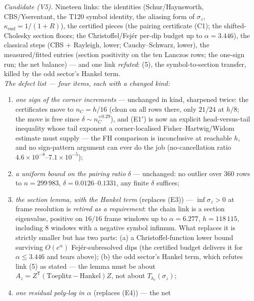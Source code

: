 \documentclass[11pt,a4paper]{article}
\begin{document}
\begin{keybox}
\emph{Candidate (V5).} Nineteen links: the identities (Schur/Haynsworth, CBS/Yserentant, the
T120 symbol identity, the aliasing form of $\sigma_z$, $\kappa_{\mathrm{end}}=1/(1+R)$), the
certified pieces (the pairing certificate (C1); the shifted-Cholesky section floors; the
Christoffel/Fej\'er per-dip budget up to $\alpha=3.446$), the classical steps (CBS + Rayleigh,
lower; Cauchy--Schwarz, lower), the measured/fitted entries (section positivity on the ten
Lanczos rows; the one-sign run; the net balance) --- and one link \emph{refuted}: (5), the
symbol-to-section transfer, killed by the odd sector's Hankel term.\\[3pt]
\emph{The defect list --- four items, each with a changed kind:}
\begin{enumerate}[leftmargin=1.6em]
\item[\textbf{(E1)}] \emph{one sign of the corner increments} --- unchanged in kind, sharpened
twice: the certificates move to $n_C=h/16$ (clean on all rows there, only $21/24$ at $h/8$; the
move is free since $\delta\sim n_C^{+0.29}$), and (E1$'$) is now an explicit head-versus-tail
inequality whose tail exponent a corner-localised Fisher--Hartwig/Widom estimate must supply
--- the FH comparison is inconclusive at reachable $h$, and no sign-pattern argument can ever
do the job (no-cancellation ratio $4.6\times10^{-8}$--$7.1\times10^{-5}$);
\item[\textbf{(E2)}] \emph{a uniform bound on the pairing ratio} $\delta$ --- unchanged: no
outlier over $360$ rows to $n=299\,983$, $\delta=0.0126$--$0.1331$, any finite $\delta$
suffices;
\item[\textbf{(E3$^*$)}] \emph{the section lemma, with the Hankel term} (replaces (E3)) ---
$\inf\sigma_z>0$ at frame resolution is \emph{retired as a requirement}: the chain link is a
section eigenvalue, positive on $16/16$ frame windows up to $\alpha=6.277$, $h=118\,115$,
including $8$ windows with a negative symbol infimum. What replaces it is strictly smaller but
has two parts: (a) a Christoffel-function lower bound surviving $O(e^{\alpha})$
Fej\'er-subresolved dips (the certified budget delivers it for $\alpha\le3.446$ and tears
above); (b) the odd sector's Hankel term, which refutes link (5) as stated --- the lemma must
be about $A_z=Z^{\mathsf T}(\mathrm{Toeplitz}-\mathrm{Hankel})Z$, not about
$T_{h_c}(\sigma_z)$;
\item[\textbf{(E4$^*$)}] \emph{one residual poly-log in $\alpha$} (replaces (E4)) --- the net

\end{enumerate}
\end{keybox}
\end{document}
